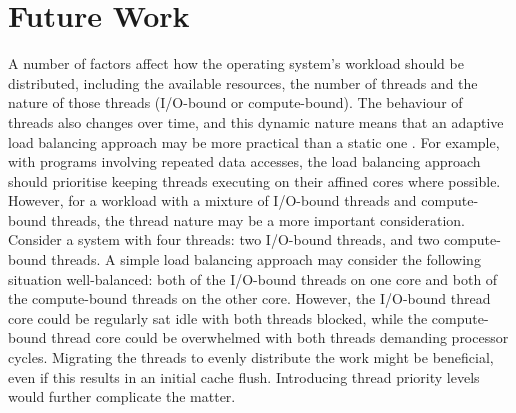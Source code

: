 \documentclass[bsc,frontabs,singlespacing,parskip,deptreport]{infthesis}
\begin{document}

\section{Future Work} \label{future-work}
A number of factors affect how the operating system's workload should be distributed, including the available resources, the number of threads and the nature of those threads (I/O-bound or compute-bound). The behaviour of threads also changes over time, and this dynamic nature means that an adaptive load balancing approach may be more practical than a static one \cite{adaptive-sched}. For example, with programs involving repeated data accesses, the load balancing approach should prioritise keeping threads executing on their affined cores where possible. However, for a workload with a mixture of I/O-bound threads and compute-bound threads, the thread nature may be a more important consideration. Consider a system with four threads: two I/O-bound threads, and two compute-bound threads. A simple load balancing approach may consider the following situation well-balanced: both of the I/O-bound threads on one core and both of the compute-bound threads on the other core. However, the I/O-bound thread core could be regularly sat idle with both threads blocked, while the compute-bound thread core could be overwhelmed with both threads demanding processor cycles. Migrating the threads to evenly distribute the work might be beneficial, even if this results in an initial cache flush. Introducing thread priority levels would further complicate the matter. 
\end{document}

